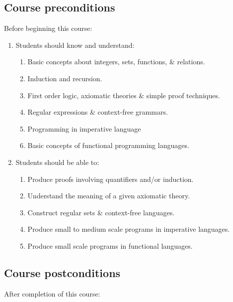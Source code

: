 \documentclass[11pt]{article}
\theoremstyle{definition}
\begin{document}
\subsection{Course preconditions}
\label{sec:org40d9c94}

Before beginning this course:

\begin{enumerate}
\item Students should know and understand:
\begin{enumerate}
\item Basic concepts about integers, sets, functions, \& relations.
\item Induction and recursion.
\item First order logic, axiomatic theories \& simple proof techniques.
\item Regular expressions \& context-free grammars.
\item Programming in imperative language
\item Basic concepts of functional programming languages.
\end{enumerate}
\item Students should be able to:
\begin{enumerate}
\item Produce proofs involving quantifiers and/or induction.
\item Understand the meaning of a given axiomatic theory.
\item Construct regular sets \& context-free languages.
\item Produce small to medium scale programs in imperative languages.
\item Produce small scale programs in functional languages.
\end{enumerate}
\end{enumerate}

\subsection{Course postconditions}
\label{sec:org3fa5259}

After completion of this course:
\end{document}
